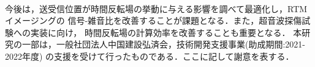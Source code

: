 \documentclass[jscefinal]{jjsce}%
\begin{document}
\\
\hspace{\parindent}
今後は，送受信位置が時間反転場の挙動に与える影響を調べて最適化し，RTMイメージングの
信号-雑音比を改善することが課題となる．また，超音波探傷試験への実装に向け，
時間反転場の計算効率を改善することも重要となる．
%
\Acknowledgment %
本研究の一部は，一般社団法人中国建設弘済会，技術開発支援事業(助成期間:2021-2022年度)
の支援を受けて行ったものである．ここに記して謝意を表する．
\end{document}
